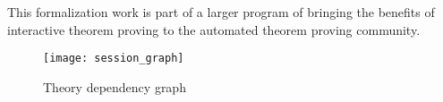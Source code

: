 \documentclass[10pt,a4paper]{article}
\begin{document}
\medskip

This formalization work is part of a larger program of bringing the benefits of
interactive theorem proving to the automated theorem proving community.

\begin{figure}
\begin{center}
  \texttt{[image: session\_graph]}
\end{center}
\caption{Theory dependency graph}
\label{fig:thys}
\end{figure}



%
%



\end{document}
